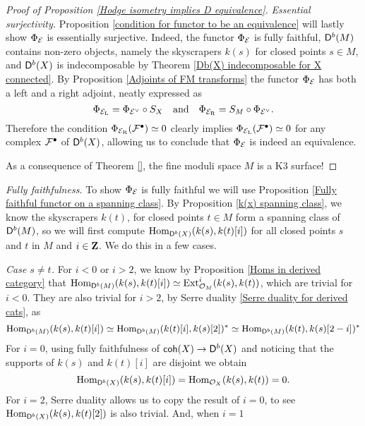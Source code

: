 \begin{proof}[Proof of Proposition \ref{Hodge isometry implies D equivalence}]
    

    \vspace{0.3 cm}
    \noindent
    \textsl{Essential surjectivity.} Proposition \ref{condition for functor to be an equivalence} will lastly show $\Phi_{\mathcal E}$ is essentially surjective. Indeed, the functor $\Phi_{\mathcal E}$ is fully faithful, $\mathsf{D}^b(M)$ contains non-zero objects, namely the skyscrapers $k(s)$ for closed points $s \in M$, and $\mathsf{D}^b(X)$ is indecomposable by Theorem \ref{Db(X) indecomposable for X connected}. By Proposition \ref{Adjoints of FM transforms} the functor $\Phi_{\mathcal E}$ has both a left and a right adjoint, neatly expressed as
    \[
        \Phi_{\mathcal E_\mathrm{L}} = \Phi_{\mathcal E^\vee} \circ S_X \quad \text{and} \quad \Phi_{\mathcal E_\mathrm{R}} = S_M \circ \Phi_{\mathcal E^\vee}.
    \]
    Therefore the condition $\Phi_{\mathcal E_\mathrm{R}}(\mathcal F^\bullet) \simeq 0$ clearly implies $\Phi_{\mathcal E_\mathrm{L}}(\mathcal F^\bullet) \simeq 0$ for any complex $\mathcal F^\bullet$ of $\mathsf{D}^b(X)$, allowing us to conclude that $\Phi_{\mathcal E}$ is indeed an equivalence.

    \vspace{0.3 cm}

    As a consequence of Theorem \ref{}, the fine moduli space $M$ is a K3 surface!
\end{proof}



\vspace{5cm}

    \textsl{Fully faithfulness.} To show $\Phi_{\mathcal E}$ is fully faithful we will use Proposition \ref{Fully faithful functor on a spanning class}. By Proposition \ref{k(x) spanning class}, we know the skyscrapers $k(t)$, for closed points $t \in M$ form a spanning class of $\mathsf{D}^b(M)$, so we will first compute $\operatorname{Hom}_{\mathsf{D}^b(X)}(k(s), k(t)[i])$ for all closed points $s$ and $t$ in $M$ and $i \in \mathbf Z$. We do this in a few cases.

    \vspace{0.3cm}
    \noindent
    \textsl{Case $s \neq t$.} For $i < 0$ or $i > 2$, we know by Proposition \ref{Homs in derived category} that $\operatorname{Hom}_{\mathsf{D}^b(M)}(k(s), k(t)[i]) \simeq \operatorname{Ext}^i_{{\mathcal{O}_{M}}}(k(s), k(t))$, which are trivial for $i < 0$. They are also trivial for $i > 2$, by Serre duality \ref{Serre duality for derived cats}, as
    \[
        \operatorname{Hom}_{\mathsf{D}^b(M)}(k(s), k(t)[i]) \simeq \operatorname{Hom}_{\mathsf{D}^b(M)}(k(t)[i], k(s)[2])^* \simeq \operatorname{Hom}_{\mathsf{D}^b(M)}(k(t), k(s)[2 - i])^*
    \]   
    For $i = 0$, using fully faithfulness of $\mathsf{coh}(X) \to \mathsf{D}^b(X)$ and noticing that the supports of $k(s)$ and $k(t)[i]$ are disjoint we obtain 
    \[
    \operatorname{Hom}_{\mathsf{D}^b(X)}(k(s), k(t)[i]) = \operatorname{Hom}_{{\mathcal{O}_{X}}}(k(s), k(t)) = 0.
    \]
    For $i = 2$, Serre duality allows us to copy the result of $i = 0$, to see $\operatorname{Hom}_{\mathsf{D}^b(X)}(k(s), k(t)[2])$ is also trivial.
    And, when $i = 1$ 

